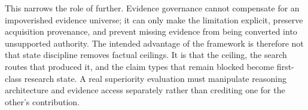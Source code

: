 This narrows the role of \RAKL{} further. Evidence governance cannot compensate for an impoverished evidence universe; it can only make the limitation explicit, preserve acquisition provenance, and prevent missing evidence from being converted into unsupported authority. The intended advantage of the framework is therefore not that state discipline removes factual ceilings. It is that the ceiling, the search routes that produced it, and the claim types that remain blocked become first-class research state. A real superiority evaluation must manipulate reasoning architecture and evidence access separately rather than crediting one for the other's contribution.
